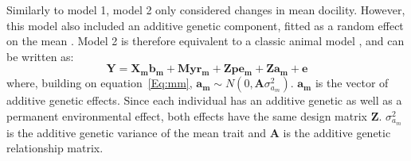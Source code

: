\documentclass[a4paper,12pt,twoside]{article}
\begin{document}
	Similarly to model 1, model 2 only considered changes in mean docility. 
	However, this model also included an additive genetic component, fitted as a random effect on the mean \citep{Waldmann2009}.
	Model 2 is therefore equivalent to a classic animal model \citep{Kruuk2004}, and can be written as:
	\begin{equation}\label{Eq:am}
	\boldsymbol{Y} = \boldsymbol{X_m b_m} + \boldsymbol{M yr_m} + \boldsymbol{Z pe_m} + \boldsymbol{Z a_m} + \boldsymbol{e}
	\end{equation}
	where, building on equation~\ref{Eq:mm}, $\boldsymbol{a_m} \sim N(0, \boldsymbol{A}\sigma_{a_{m}}^2)$.
	$\boldsymbol{a_m}$ is the vector of additive genetic effects. 
	Since each individual has an additive genetic as well as a permanent environmental effect, both effects have the same design matrix $\boldsymbol{Z}$.
	$\sigma_{a_{m}}^2$ is the additive genetic variance of the mean trait and $\boldsymbol{A}$ is the additive genetic relationship matrix.
	
\end{document}
